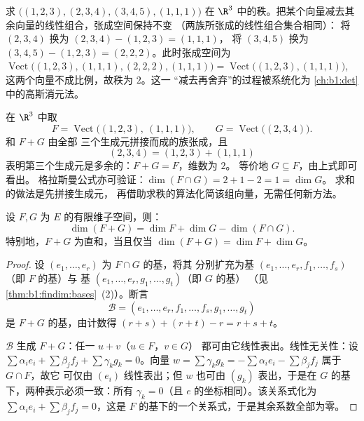 \begin{example}[用消元法计算秩]
\label{ex:b1:findim:rankcomputation}
求 $\bigl((1,2,3), (2,3,4), (3,4,5), (1,1,1)\bigr)$ 在
$\R^3$ 中的秩。把某个向量减去其余向量的线性组合，张成空间保持不变
（两族所张成的线性组合集合相同）：
将 $(2,3,4)$ 换为 $(2,3,4) - (1,2,3) = (1,1,1)$，
将 $(3,4,5)$ 换为 $(3,4,5) - (1,2,3) = (2,2,2)$。此时张成空间为
$\operatorname{Vect}\bigl((1,2,3), (1,1,1), (2,2,2),
(1,1,1)\bigr) = \operatorname{Vect}\bigl((1,2,3), (1,1,1)\bigr)$,
这两个向量不成比例，故秩为 $2$。这一
“减去再舍弃”的过程被系统化为
\cref{ch:b1:det}中的高斯消元法。
\end{example}

\begin{example}[通过拼接求和]
\label{ex:b1:findim:sumconcat}
在 $\R^3$ 中取
\[
F = \operatorname{Vect}\bigl((1,2,3),\ (1,1,1)\bigr),
\qquad
G = \operatorname{Vect}\bigl((2,3,4)\bigr) .
\]
和 $F + G$ 由全部
三个生成元拼接而成的族张成，且
\[
(2, 3, 4) = (1, 2, 3) + (1, 1, 1)
\]
表明第三个生成元是多余的：$F + G = F$，维数为 $2$。
等价地 $G \subseteq F$，由上式即可看出。
格拉斯曼公式亦可验证：$\dim(F \cap G) = 2 + 1 - 2 = 1 = \dim G$。
求和的做法是先拼接生成元，
再借助求秩的算法化简该组向量，无需任何新方法。
\end{example}

\begin{theorem}[格拉斯曼公式]\label{thm:b1:findim:grassmann}
设 $F, G$ 为
$E$ 的有限维子空间，则：
\[
\dim(F + G) = \dim F + \dim G - \dim(F \cap G) .
\]
特别地，$F + G$ 为直和，当且仅当 $\dim(F + G) = \dim F + \dim G$。
\end{theorem}

\begin{proof}
设 $(e_1, \dots, e_r)$ 为 $F \cap G$ 的基，将其
分别扩充为基 $(e_1, \dots, e_r, f_1, \dots, f_s)$（即 $F$ 的基）与
基 $(e_1, \dots, e_r, g_1, \dots, g_t)$（即 $G$ 的基）
（见\cref{thm:b1:findim:bases}~(2)）。断言
\[
\mathcal{B} = (e_1, \dots, e_r, f_1, \dots, f_s, g_1, \dots, g_t)
\]
是 $F + G$ 的基，由计数得 $(r + s) +
(r + t) - r = r + s + t$。

$\mathcal{B}$ 生成 $F + G$：任一 $u + v$（$u \in F$，$v \in G$）
都可由它线性表出。线性无关性：设 $\sum \alpha_i e_i + \sum
\beta_j f_j + \sum \gamma_k g_k = 0$。向量 $w = \sum \gamma_k
g_k = -\sum\alpha_i e_i - \sum\beta_j f_j$ 属于 $G \cap F$，故它
可仅由 $(e_i)$ 线性表出；但 $w$ 也可由 $(g_k)$ 表出，于是在
$G$ 的基下，两种表示必须一致：所有
$\gamma_k = 0$（且 $e$ 的坐标相同）。该关系式化为
$\sum\alpha_i e_i + \sum\beta_j f_j = 0$，这是
$F$ 的基下的一个关系式，于是其余系数全部为零。
\end{proof}

